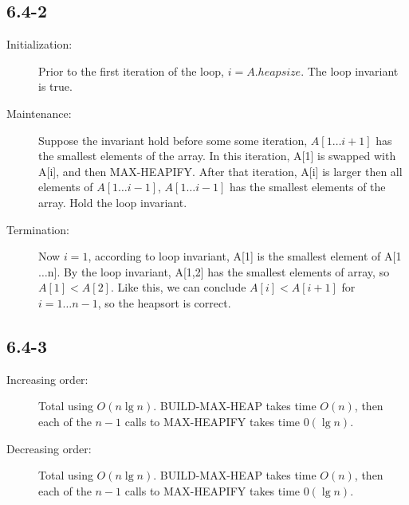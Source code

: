 \documentclass{article}
\begin{document}
\subsection*{6.4-2}
\begin{description}
\item[Initialization:] Prior to the first iteration of the loop, $i = A.heapsize$. The loop invariant is true.
\item[Maintenance:] Suppose the invariant hold before some some iteration,
  $A[1\ldots{}i+1]$ has the smallest elements of the array. In this iteration, A[1] is swapped with A[i], and then MAX-HEAPIFY. After that iteration,  A[i] is larger then all elements of $A[1\ldots{}i-1]$, $A[1\ldots{}i-1]$ has the smallest elements of the array. Hold the loop invariant.
\item[Termination:] Now $i = 1$, according to loop invariant, A[1] is the smallest element of A[1$\ldots$n]. By the loop invariant, A[1,2] has the smallest elements of array, so $A[1] < A[2]$. Like this, we can conclude $A[i] < A[i+1]$ for $i=1\ldots{}n-1$, so the heapsort is correct.
\end{description}

\subsection*{6.4-3}
\begin{description}
\item[Increasing order:] Total using $O(n\lg n)$. BUILD-MAX-HEAP takes time $O(n)$, then each of the $n-1$ calls to MAX-HEAPIFY takes time $0(\lg n)$.
\item[Decreasing order:] Total using $O(n\lg n)$. BUILD-MAX-HEAP takes time $O(n)$, then each of the $n-1$ calls to MAX-HEAPIFY takes time $0(\lg n)$.
\end{description}
\end{document}
